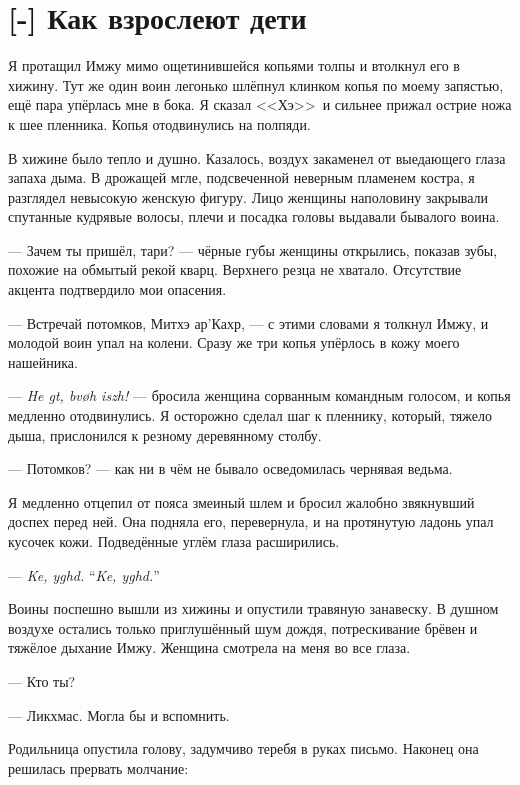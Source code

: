 \section{[-] Как взрослеют дети}

\textspace

Я протащил Имжу мимо ощетинившейся копьями толпы и втолкнул его в хижину.
Тут же один воин легонько шлёпнул клинком копья по моему запястью, ещё пара упёрлась мне в бока.
Я сказал <<Хэ>>\FM\ и сильнее прижал острие ножа к шее пленника.
Копья отодвинулись на полпяди.

В хижине было тепло и душно.
Казалось, воздух закаменел от выедающего глаза запаха дыма.
В дрожащей мгле, подсвеченной неверным пламенем костра, я разглядел невысокую женскую фигуру.
Лицо женщины наполовину закрывали спутанные кудрявые волосы, плечи и посадка головы выдавали бывалого воина.

--- Зачем ты пришёл, тари? --- чёрные губы женщины открылись, показав зубы, похожие на обмытый рекой кварц.
Верхнего резца не хватало.
Отсутствие акцента подтвердило мои опасения.

--- Встречай потомков, Митхэ ар’Кахр, --- с этими словами я толкнул Имжу, и молодой воин упал на колени.
Сразу же три копья упёрлось в кожу моего нашейника.

--- \textit{He gt, bv\o{}h iszh!} --- бросила женщина сорванным командным голосом, и копья медленно отодвинулись.
Я осторожно сделал шаг к пленнику, который, тяжело дыша, прислонился к резному деревянному столбу.

--- Потомков? --- как ни в чём не бывало осведомилась чернявая ведьма.

Я медленно отцепил от пояса змеиный шлем и бросил жалобно звякнувший доспех перед ней.
Она подняла его, перевернула, и на протянутую ладонь упал кусочек кожи.
Подведённые углём глаза расширились.

{--- \textit{Ke, yghd.}}
{``\textit{Ke, yghd.}''}

Воины поспешно вышли из хижины и опустили травяную занавеску.
В душном воздухе остались только приглушённый шум дождя, потрескивание брёвен и тяжёлое дыхание Имжу.
Женщина смотрела на меня во все глаза.

--- Кто ты?

--- Ликхмас.
Могла бы и вспомнить.

Родильница опустила голову, задумчиво теребя в руках письмо.
Наконец она решилась прервать молчание:


